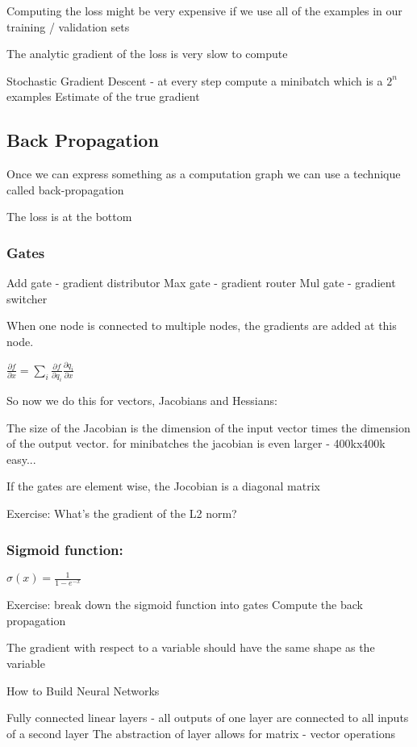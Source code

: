 Computing the loss might be very expensive if we use all of the examples in our training / validation sets

The analytic gradient of the loss is very slow to compute

Stochastic Gradient Descent - at every step compute a minibatch which is a $2^n$ examples
Estimate of the true gradient

\subsection{Back Propagation}
Once we  can express something as a computation graph we can use a technique called back-propagation

The loss is at the bottom

\subsubsection{Gates}
Add gate - gradient distributor 
Max gate - gradient router
Mul gate - gradient switcher

When one node is connected to multiple nodes, the gradients are added at this node.

$\frac{\partial f}{\partial x} = \sum_i \frac{\partial f}{\partial q_i}\frac{\partial q_i}{\partial x} $

So now we do this for vectors, Jacobians and Hessians:

The size of the Jacobian is the dimension of the input vector times the dimension of the output vector. for minibatches the jacobian is even larger - 400kx400k easy... 

If the gates are element wise, the Jocobian is a diagonal matrix

Exercise: What's the gradient of the L2 norm? 

\subsubsection{Sigmoid function:}
$\sigma (x) = \frac{1}{1-e^{-x}}$

Exercise: break down the sigmoid function into gates
Compute the back propagation

The gradient with respect to a variable should have the same shape as the variable

How to Build Neural Networks

Fully connected linear layers - all outputs of one layer are connected to all inputs of a second layer
The abstraction of layer allows for matrix - vector operations





